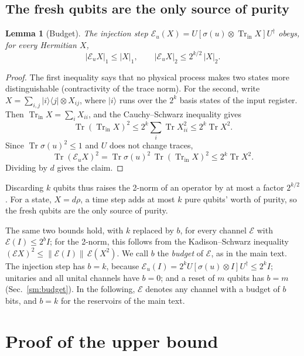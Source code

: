 \documentclass[aps,prl,twocolumn,superscriptaddress,floatfix]{revtex4-2}
\theoremstyle{plain}
\newtheorem{lemma}{Lemma}
\newcommand{\tr}{\operatorname{Tr}}
\newcommand{\ket}[1]{|#1\rangle}
\newcommand{\ketbra}[2]{|#1\rangle\!\langle #2|}
\newcommand{\nrm}[2]{\lvert #1\rvert_{#2}}
\newcommand{\Norm}[1]{\lVert #1\rVert}
\newcommand{\cE}{\mathcal E}
\begin{document}
\subsection{The fresh qubits are the only source of purity}

\begin{lemma}[Budget]\label{lem:norms}
The injection step $\cE_u(X)=U[\sigma(u)\otimes\tr_{\mathrm{in}}X]U^\dagger$ obeys, for every Hermitian $X$,
\begin{equation}
\nrm{\cE_uX}1\le\nrm X1,\qquad\nrm{\cE_uX}2\le2^{k/2}\,\nrm X2 .
\label{eq:S-norms}
\end{equation}
\end{lemma}

\begin{proof}
The first inequality says that no physical process makes two states more distinguishable (contractivity of the trace norm). For the second, write $X=\sum_{i,j}\ketbra ij\otimes X_{ij}$, where $\ket i$ runs over the $2^k$ basis states of the input register. Then $\tr_{\mathrm{in}}X=\sum_iX_{ii}$, and the Cauchy--Schwarz inequality gives
\[
\tr(\tr_{\mathrm{in}}X)^2\le2^k\sum_i\tr X_{ii}^2\le2^k\tr X^2 .
\]
Since $\tr\sigma(u)^2\le1$ and $U$ does not change traces,
\[
\tr(\cE_uX)^2=\tr\sigma(u)^2\,\tr(\tr_{\mathrm{in}}X)^2\le2^k\tr X^2 .
\]
Dividing by $d$ gives the claim.
\end{proof}

Discarding $k$ qubits thus raises the 2-norm of an operator by at most a factor $2^{k/2}$. For a state, $X=d\rho$, a time step adds at most $k$ pure qubits' worth of purity, so the fresh qubits are the only source of purity.

The same two bounds hold, with $k$ replaced by $b$, for every channel $\cE$ with $\cE(I)\le2^bI$; for the 2-norm, this follows from the Kadison--Schwarz inequality $(\cE X)^2\le\Norm{\cE(I)}\,\cE(X^2)$. We call $b$ the \emph{budget} of $\cE$, as in the main text. The injection step has $b=k$, because $\cE_u(I)=2^kU[\sigma(u)\otimes I]U^\dagger\le2^kI$; unitaries and all unital channels have $b=0$; and a reset of $m$ qubits has $b=m$ (Sec.~\ref{sm:budget}). In the following, $\cE$ denotes any channel with a budget of $b$ bits, and $b=k$ for the reservoirs of the main text.

\section{Proof of the upper bound}
\label{sm:upper}
\end{document}
